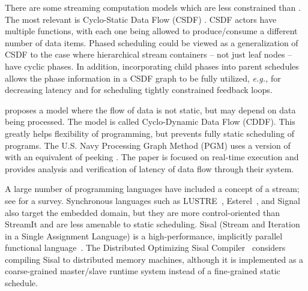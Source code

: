 There are some streaming computation models which are less constrained
than {\SDF}. The most relevant is Cyclo-Static Data Flow (CSDF)
\cite{BELP96,parks95comparison}.  CSDF actors have multiple {\work}
functions, with each one being allowed to produce/consume a different
number of data items.  Phased scheduling could be viewed as a
generalization of CSDF to the case where hierarchical stream
containers -- not just leaf nodes -- have cyclic phases.  In addition,
incorporating child phases into parent schedules allows the phase
information in a CSDF graph to be fully utilized, {\it e.g.,} for
decreasing latency and for scheduling tightly constrained feedback
loops.

\cite{wauters96cyclodynamic} proposes a model where the flow of data
is not static, but may depend on data being processed. The model is
called Cyclo-Dynamic Data Flow (CDDF). This greatly helps flexibility
of programming, but prevents fully static scheduling of programs. The
U.S. Navy Processing Graph Method (PGM) uses a version of {\SDF} with
an equivalent of peeking \cite{goddard00navy}.  The paper is focused
on real-time execution and provides analysis and verification of
latency of data flow through their system.

A large number of programming languages have included a concept of a
stream; see \cite{survey97} for a survey.  Synchronous languages such
as LUSTRE~\cite{lustre}, Esterel~\cite{esterel92}, and
Signal~\cite{signal} also target the embedded domain, but they are
more control-oriented than StreamIt and are less amenable to static
scheduling.  Sisal (Stream and Iteration in a Single Assignment
Language) is a high-performance, implicitly parallel functional
language~\cite{sisal}.  The Distributed Optimizing Sisal
Compiler~\cite{sisal} considers compiling Sisal to distributed memory
machines, although it is implemented as a coarse-grained master/slave
runtime system instead of a fine-grained static schedule.

